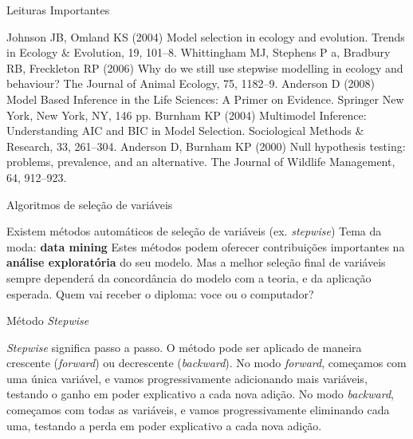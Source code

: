 \documentclass{beamer}\usepackage[]{graphicx}\usepackage[]{color}
\begin{document}
\begin{frame}{Leituras Importantes}

\begin{scriptsize}

Johnson JB, Omland KS (2004) Model selection in ecology and evolution. Trends in Ecology & Evolution, 19, 101–8.
\vfill
Whittingham MJ, Stephens P a, Bradbury RB, Freckleton RP (2006) Why do we still use stepwise modelling in ecology and behaviour? The Journal of Animal Ecology, 75, 1182–9.
 \vfill
Anderson D (2008) Model Based Inference in the Life Sciences: A Primer on Evidence. Springer New York, New York, NY, 146 pp.
\vfill
Burnham KP (2004) Multimodel Inference: Understanding AIC and BIC in Model Selection. Sociological Methods & Research, 33, 261–304.
\vfill
Anderson D, Burnham KP (2000) Null hypothesis testing: problems, prevalence, and an alternative. The Journal of Wildlife Management, 64, 912–923.

\end{scriptsize}

\end{frame}

\begin{frame}{Algoritmos de seleção de variáveis}

Existem métodos automáticos de seleção de variáveis (ex. \emph{stepwise}) 
\vfill
Tema da moda: \textbf{data mining} \pause
\vfill
Estes métodos podem oferecer contribuições importantes na \textbf{análise exploratória} do seu modelo. \pause
\vfill
Mas a melhor seleção final de variáveis sempre dependerá da concordância do modelo com a teoria, e da aplicação esperada. \pause
\vfill
Quem vai receber o diploma: voce ou o computador?

\end{frame}


\begin{frame}{Método \emph{Stepwise}}

\emph{Stepwise} significa passo a passo. \pause
\vfill
O método pode ser aplicado de maneira crescente (\emph{forward}) ou decrescente (\emph{backward}). \pause
\vfill
No modo \emph{forward}, começamos com uma única variável, e vamos progressivamente adicionando mais variáveis, testando o ganho em poder explicativo a cada nova adição. \pause
\vfill
No modo \emph{backward}, começamos com todas as variáveis, e vamos progressivamente eliminando cada uma, testando a perda em poder explicativo a cada nova adição.

\end{frame}
\end{document}
